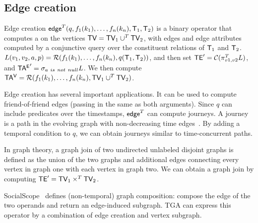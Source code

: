\subsection{Edge creation}
\label{sec:algebra:ecreate}

Edge creation
$\textsf{edge}^T(q,f_1(k_1),\ldots,f_n(k_n),\mathsf{T}_1,\mathsf{T}_2)$ is a binary
operator that computes a \tg on the vertices $\textsf{TV} = \textsf{TV}_1 \cup^T
\textsf{TV}_2$, with edges and edge attributes computed by a conjunctive query
over the constituent relations of $\mathsf{T}_1$ and $\mathsf{T}_2$.  
$L(v_1,v_2,a,p) = \mathcal{R}(f_1(k_1),\ldots,f_n(k_n),q(\mathsf{T}_1,
  \mathsf{T}_2))$, and then set $\textsf{TE}' = \mathcal{C}(\pi^T_{v1,v2} L)$, and $\mathsf{TA^{E}}'
= \sigma_{a~is~not~null} L$.  We then compute $\mathsf{TA^{V}} =
\mathcal{R}(f_1(k_1),\ldots,f_n(k_n),\textsf{TV}_1 \cup^T \textsf{TV}_2)$.


Edge creation has several important applications.  It can be used to
compute friend-of-friend edges (passing in the same \tg as both
arguments).  Since $q$ can include predicates over the timestamps,
$\textsf{edge}^T$ can compute journeys.  A journey is a path in the
evolving graph with non-decreasing time
edges~\cite{Casteigts2011,Ferreira2004}.  By adding a temporal
condition to $q$, we can obtain journeys similar to time-concurrent
paths.

In graph theory, a graph join of two undirected unlabeled disjoint
graphs is defined as the union of the two graphs and additional edges
connecting every vertex in graph one with each vertex in graph two.
We can obtain a graph join by computing $\textsf{TE}' = \textsf{TV}_1 \times^T \textsf{TV}_2$.

SocialScope~\cite{Amer-Yahia2009} defines (non-temporal) graph
composition: compose the edge of the two operands and return an
edge-induced subgraph.  TGA can express this operator by a combination
of edge creation and vertex subgraph.

